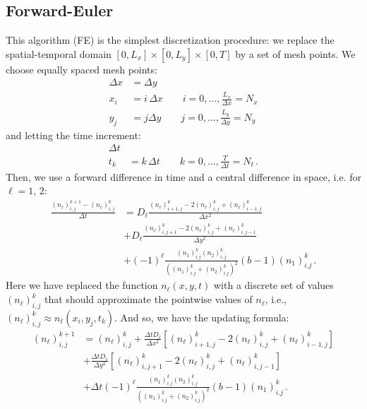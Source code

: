 \subsection{Forward-Euler}

This algorithm (FE) is the simplest discretization procedure: we replace
the spatial-temporal domain $\left[0,L_{x}\right]\times\left[0,L_{y}\right]\times\left[0,T\right]$
by a set of mesh points. We choose equally spaced mesh points:
\begin{align*}
\Delta x & =\Delta y\\
x_{i} & =i\,\Delta x\qquad i=0,\ldots,\frac{L_{x}}{\Delta x}=N_{x}\\
y_{j} & =j\Delta y\qquad j=0,\ldots,\frac{L_{y}}{\Delta y}=N_{y}
\end{align*}
and letting the time increment:
\begin{align*}
\Delta t\\
t_{k} & =k\,\Delta t\qquad k=0,\ldots,\frac{T}{\Delta t}=N_{t}\,.
\end{align*}
Then, we use a forward difference in time and a central difference
in space, i.e. for $\ell=1,\,2$:
\begin{align*}
\frac{\left(n_{\ell}\right)_{i,j}^{k+1}-\left(n_{\ell}\right)_{i,j}^{k}}{\Delta t} & =D_{\ell}\frac{\left(n_{\ell}\right)_{i+1,j}^{k}-2\left(n_{\ell}\right)_{i,j}^{k}+\left(n_{\ell}\right)_{i-1,j}^{k}}{\Delta x^{2}}\\
 & +D_{\ell}\frac{\left(n_{\ell}\right)_{i,j+1}^{k}-2\left(n_{\ell}\right)_{i,j}^{k}+\left(n_{\ell}\right)_{i,j-1}^{k}}{\Delta y^{2}}\\
 & +\left(-1\right)^{\ell}\frac{\left(n_{1}\right)_{i.j}^{k}\left(n_{2}\right)_{i,j}^{k}}{\left(\left(n_{1}\right)_{i.j}^{k}+\left(n_{2}\right)_{i.j}^{k}\right)^{2}}\left(b-1\right)\left(n_{1}\right)_{i.j}^{k}\,.
\end{align*}
Here we have replaced the function $n_{\ell}\left(x,y,t\right)$ with
a discrete set of values $\left(n_{\ell}\right)_{i,j}^{k}$ that should
approximate the pointwise values of $n_{\ell}$, i.e., $\left(n_{\ell}\right)_{i,j}^{k}\approx n_{\ell}\left(x_{i},y_{j},t_{k}\right)$.
And so, we have the updating formula:
\begin{align}
\left(n_{\ell}\right)_{i,j}^{k+1} & =\left(n_{\ell}\right)_{i,j}^{k}+\frac{\Delta tD_{\ell}}{\Delta x^{2}}\left[\left(n_{\ell}\right)_{i+1,j}^{k}-2\left(n_{\ell}\right)_{i,j}^{k}+\left(n_{\ell}\right)_{i-1,j}^{k}\right]\nonumber \\
 & +\frac{\Delta tD_{\ell}}{\Delta y^{2}}\left[\left(n_{\ell}\right)_{i,j+1}^{k}-2\left(n_{\ell}\right)_{i,j}^{k}+\left(n_{\ell}\right)_{i,j-1}^{k}\right]\nonumber \\
 & +\Delta t\left(-1\right)^{\ell}\frac{\left(n_{1}\right)_{i.j}^{k}\left(n_{2}\right)_{i,j}^{k}}{\left(\left(n_{1}\right)_{i.j}^{k}+\left(n_{2}\right)_{i.j}^{k}\right)^{2}}\left(b-1\right)\left(n_{1}\right)_{i.j}^{k}\,.\label{eq:FE}
\end{align}
